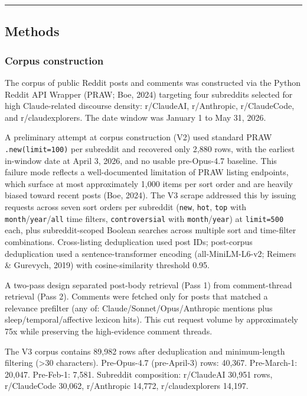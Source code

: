 \documentclass[11pt]{article}
\begin{document}
\bigskip\hrule\bigskip

\subsection{Methods}

\subsubsection{Corpus construction}

The corpus of public Reddit posts and comments was constructed via the Python Reddit API Wrapper (PRAW; Boe, 2024) targeting four subreddits selected for high Claude-related discourse density: r/ClaudeAI, r/Anthropic, r/ClaudeCode, and r/claudexplorers. The date window was January 1 to May 31, 2026.

A preliminary attempt at corpus construction (V2) used standard PRAW \texttt{.new(limit=100)} per subreddit and recovered only 2,880 rows, with the earliest in-window date at April 3, 2026, and no usable pre-Opus-4.7 baseline. This failure mode reflects a well-documented limitation of PRAW listing endpoints, which surface at most approximately 1,000 items per sort order and are heavily biased toward recent posts (Boe, 2024). The V3 scrape addressed this by issuing requests across seven sort orders per subreddit (\texttt{new}, \texttt{hot}, \texttt{top} with \texttt{month}/\texttt{year}/\texttt{all} time filters, \texttt{controversial} with \texttt{month}/\texttt{year}) at \texttt{limit=500} each, plus subreddit-scoped Boolean searches across multiple sort and time-filter combinations. Cross-listing deduplication used post IDs; post-corpus deduplication used a sentence-transformer encoding (all-MiniLM-L6-v2; Reimers \& Gurevych, 2019) with cosine-similarity threshold 0.95.

A two-pass design separated post-body retrieval (Pass 1) from comment-thread retrieval (Pass 2). Comments were fetched only for posts that matched a relevance prefilter (any of: Claude/Sonnet/Opus/Anthropic mentions plus sleep/temporal/affective lexicon hits). This cut request volume by approximately 75x while preserving the high-evidence comment threads.

The V3 corpus contains 89,982 rows after deduplication and minimum-length filtering (\textgreater{}30 characters). Pre-Opus-4.7 (pre-April-3) rows: 40,367. Pre-March-1: 20,047. Pre-Feb-1: 7,581. Subreddit composition: r/ClaudeAI 30,951 rows, r/ClaudeCode 30,062, r/Anthropic 14,772, r/claudexplorers 14,197.
\end{document}
